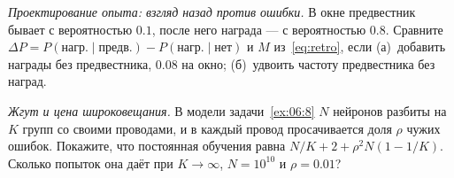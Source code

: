 \begin{exercise}[\lvlB]
\label{ex:07:7}
\emph{Проектирование опыта: взгляд назад против ошибки.} В окне предвестник бывает с вероятностью $0.1$, после него награда --- с вероятностью $0.8$. Сравните $\Delta P=P(\text{нагр.}\mid\text{предв.})-P(\text{нагр.}\mid\text{нет})$ и $M$ из~\eqref{eq:retro}, если (а)~добавить награды без предвестника, $0.08$ на окно; (б)~удвоить частоту предвестника без наград.
\end{exercise}

\begin{exercise}[\lvlC]
\label{ex:07:8}
\emph{Жгут и цена широковещания.} В модели задачи~\ref{ex:06:8} $N$ нейронов разбиты на $K$ групп со своими проводами, и в каждый провод просачивается доля $\rho$ чужих ошибок. Покажите, что постоянная обучения равна $N/K+2+\rho^2N(1-1/K)$. Сколько попыток она даёт при $K\to\infty$, $N=10^{10}$ и $\rho=0.01$?
\end{exercise}
